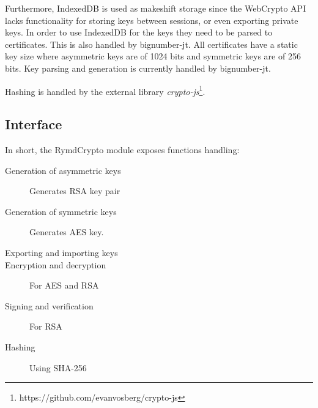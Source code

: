 Furthermore, IndexedDB is used as makeshift storage since the WebCrypto API lacks functionality for storing keys between sessions, or even exporting private keys. In order to use IndexedDB for the keys they need to be parsed to certificates. This is also handled by bignumber-jt. All certificates have a static key size where asymmetric keys are of 1024 bits and symmetric keys are of 256 bits. Key parsing and generation is currently handled by bignumber-jt.

Hashing is handled by the external library \emph{crypto-js}\footnote{https://github.com/evanvosberg/crypto-js}.

\subsection{Interface}

In short, the RymdCrypto module exposes functions handling:
\begin{description}
  \item[Generation of asymmetric keys] Generates RSA key pair
  \item[Generation of symmetric keys] Generates AES key.
  \item[Exporting and importing keys]
  \item[Encryption and decryption] For AES and RSA
  \item[Signing and verification] For RSA
  \item[Hashing] Using SHA-256
\end{description}

